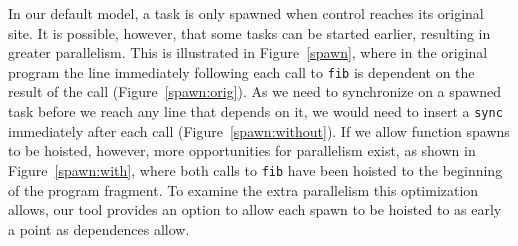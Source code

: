 In our default model, a task is only spawned when control reaches its original site.
It is possible, however, that some tasks can be started earlier, resulting in greater parallelism.
This is illustrated in Figure~\ref{spawn}, where in the original program the line immediately following each call to \texttt{fib} is dependent on the result of the call (Figure~\ref{spawn:orig}).
As we need to synchronize on a spawned task before we reach any line that depends on it, we would need to insert a \texttt{sync} immediately after each call (Figure~\ref{spawn:without}).
If we allow function spawns to be hoisted, however, more opportunities for parallelism exist, as shown in Figure~\ref{spawn:with}, where both calls to \texttt{fib} have been hoisted to the beginning of the program fragment.
To examine the extra parallelism this optimization allows, our tool provides an option to allow each spawn to be hoisted to as early a point as dependences allow.

